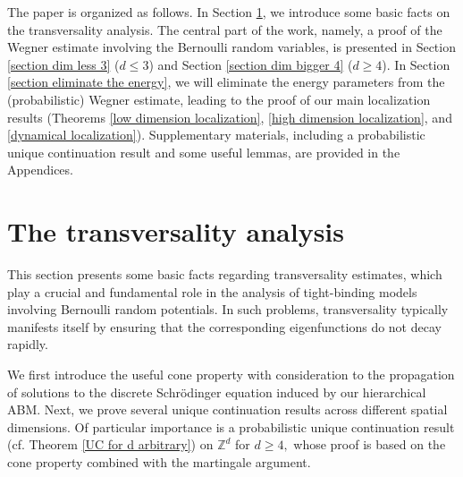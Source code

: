 \documentclass[11pt,reqno,UTF8,twoside]{amsart}
\newcommand{\Z}{\mathbb{Z}}
\theoremstyle{definition}
\numberwithin{equation}{section}
\begin{document}
The paper  is organized  as follows. In Section \ref{section transversality}, we introduce  some basic facts on the  transversality analysis. The central part of the work, namely, a proof of  the Wegner estimate involving the Bernoulli random variables, is presented in Section \ref{section dim less 3} ($d \leq 3$) and Section \ref{section dim bigger 4} ($d \geq 4$). In Section \ref{section eliminate the energy}, we  will  eliminate  the energy parameters  from the (probabilistic) Wegner estimate,  leading to the proof  of our main localization results (Theorems \ref{low dimension localization}, \ref{high dimension localization}, and \ref{dynamical localization}).  Supplementary materials, including a probabilistic unique continuation result and some useful lemmas, are  provided in the Appendices.



\section{The transversality analysis}\label{section transversality}
This section presents some basic facts regarding transversality estimates, which play a crucial and fundamental role in the analysis of tight-binding models involving Bernoulli random potentials. In such problems, transversality typically manifests itself by ensuring that the corresponding eigenfunctions do not decay rapidly.

We first introduce the useful cone property with consideration to the propagation of solutions to the discrete Schrödinger equation induced by our hierarchical ABM. Next, we prove several unique continuation results across different spatial dimensions. Of particular importance is a probabilistic unique continuation result (cf. Theorem \ref{UC for d arbitrary}) on $\Z^d$ for $d\geq 4,$ whose proof is based on the cone property combined with the martingale argument.
\end{document}
